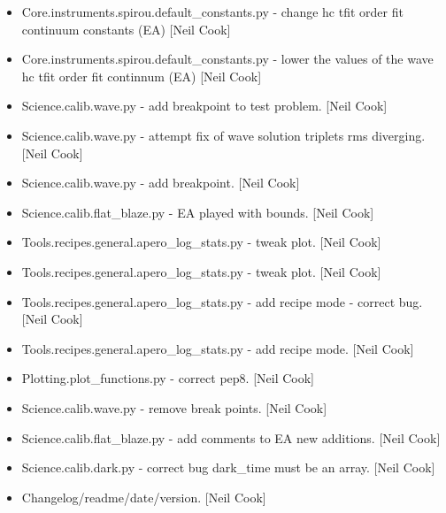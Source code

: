 \documentclass[a4paper,10pt,english]{report}
\begin{document}
\begin{itemize}
\item {} 
Core.instruments.spirou.default\_constants.py - change hc tfit order
fit continuum constants (EA) {[}Neil Cook{]}

\item {} 
Core.instruments.spirou.default\_constants.py - lower the values of the
wave hc tfit order fit continnum (EA) {[}Neil Cook{]}

\item {} 
Science.calib.wave.py - add breakpoint to test problem. {[}Neil Cook{]}

\item {} 
Science.calib.wave.py - attempt fix of wave solution triplets rms
diverging. {[}Neil Cook{]}

\item {} 
Science.calib.wave.py - add breakpoint. {[}Neil Cook{]}

\item {} 
Science.calib.flat\_blaze.py - EA played with bounds. {[}Neil Cook{]}

\item {} 
Tools.recipes.general.apero\_log\_stats.py - tweak plot. {[}Neil Cook{]}

\item {} 
Tools.recipes.general.apero\_log\_stats.py - tweak plot. {[}Neil Cook{]}

\item {} 
Tools.recipes.general.apero\_log\_stats.py - add recipe mode - correct
bug. {[}Neil Cook{]}

\item {} 
Tools.recipes.general.apero\_log\_stats.py - add recipe mode. {[}Neil
Cook{]}

\item {} 
Plotting.plot\_functions.py - correct pep8. {[}Neil Cook{]}

\item {} 
Science.calib.wave.py - remove break points. {[}Neil Cook{]}

\item {} 
Science.calib.flat\_blaze.py - add comments to EA new additions. {[}Neil
Cook{]}

\item {} 
Science.calib.dark.py - correct bug dark\_time must be an array. {[}Neil
Cook{]}

\item {} 
Changelog/readme/date/version. {[}Neil Cook{]}

\end{itemize}
\end{document}
